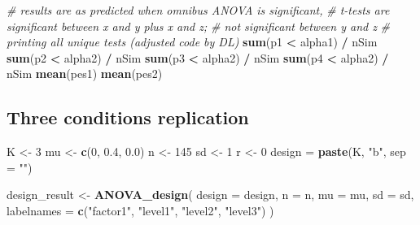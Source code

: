 \documentclass[
]{book}
\newenvironment{Shaded}{\begin{snugshade}}{\end{snugshade}}
\newcommand{\CommentTok}[1]{\textcolor[rgb]{0.56,0.35,0.01}{\textit{#1}}}
\newcommand{\DataTypeTok}[1]{\textcolor[rgb]{0.13,0.29,0.53}{#1}}
\newcommand{\DecValTok}[1]{\textcolor[rgb]{0.00,0.00,0.81}{#1}}
\newcommand{\FloatTok}[1]{\textcolor[rgb]{0.00,0.00,0.81}{#1}}
\newcommand{\KeywordTok}[1]{\textcolor[rgb]{0.13,0.29,0.53}{\textbf{#1}}}
\newcommand{\NormalTok}[1]{#1}
\newcommand{\OperatorTok}[1]{\textcolor[rgb]{0.81,0.36,0.00}{\textbf{#1}}}
\newcommand{\StringTok}[1]{\textcolor[rgb]{0.31,0.60,0.02}{#1}}
\begin{document}
\begin{Shaded}
\begin{Highlighting}[]
\CommentTok{# results are as predicted when omnibus ANOVA is significant, }
\CommentTok{# t-tests are significant between x and y plus x and z; }
\CommentTok{# not significant between y and z}
\CommentTok{# printing all unique tests (adjusted code by DL)}
\KeywordTok{sum}\NormalTok{(p1 }\OperatorTok{<}\StringTok{ }\NormalTok{alpha1) }\OperatorTok{/}\StringTok{ }\NormalTok{nSim}
\KeywordTok{sum}\NormalTok{(p2 }\OperatorTok{<}\StringTok{ }\NormalTok{alpha2) }\OperatorTok{/}\StringTok{ }\NormalTok{nSim}
\KeywordTok{sum}\NormalTok{(p3 }\OperatorTok{<}\StringTok{ }\NormalTok{alpha2) }\OperatorTok{/}\StringTok{ }\NormalTok{nSim}
\KeywordTok{sum}\NormalTok{(p4 }\OperatorTok{<}\StringTok{ }\NormalTok{alpha2) }\OperatorTok{/}\StringTok{ }\NormalTok{nSim}
\KeywordTok{mean}\NormalTok{(pes1)}
\KeywordTok{mean}\NormalTok{(pes2)}
\end{Highlighting}
\end{Shaded}

\hypertarget{three-conditions-replication-1}{%
\subsection{Three conditions replication}\label{three-conditions-replication-1}}

\begin{Shaded}
\begin{Highlighting}[]
\NormalTok{K <-}\StringTok{ }\DecValTok{3}
\NormalTok{mu <-}\StringTok{ }\KeywordTok{c}\NormalTok{(}\DecValTok{0}\NormalTok{, }\FloatTok{0.4}\NormalTok{, }\FloatTok{0.0}\NormalTok{)}
\NormalTok{n <-}\StringTok{ }\DecValTok{145}
\NormalTok{sd <-}\StringTok{ }\DecValTok{1}
\NormalTok{r <-}\StringTok{ }\DecValTok{0}
\NormalTok{design =}\StringTok{ }\KeywordTok{paste}\NormalTok{(K, }\StringTok{"b"}\NormalTok{, }\DataTypeTok{sep =} \StringTok{""}\NormalTok{)}
\end{Highlighting}
\end{Shaded}

\begin{Shaded}
\begin{Highlighting}[]
\NormalTok{design_result <-}\StringTok{ }\KeywordTok{ANOVA_design}\NormalTok{(}
  \DataTypeTok{design =}\NormalTok{ design,}
  \DataTypeTok{n =}\NormalTok{ n,}
  \DataTypeTok{mu =}\NormalTok{ mu,}
  \DataTypeTok{sd =}\NormalTok{ sd,}
  \DataTypeTok{labelnames =} \KeywordTok{c}\NormalTok{(}\StringTok{"factor1"}\NormalTok{, }\StringTok{"level1"}\NormalTok{, }\StringTok{"level2"}\NormalTok{, }\StringTok{"level3"}\NormalTok{)}
\NormalTok{  )}
\end{Highlighting}
\end{Shaded}
\end{document}
